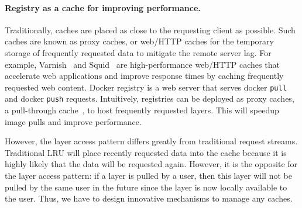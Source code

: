 \paragraph{Registry as a cache for improving performance.}
Traditionally, caches are placed as close to the requesting client as possible. 
Such caches are known as proxy caches, or web/HTTP caches for the temporary storage of 
frequently requested data to mitigate the remote server lag. 
For example, Varnish~\cite{varnish} and Squid~\cite{squid} are high-performance web/HTTP caches that accelerate web applications and improve response times by caching frequently requested web content.
Docker registry is a web server that serves docker \texttt{pull} and docker \texttt{push} requests.
Intuitively, registries can be deployed as proxy caches, \ie a pull-through cache~\cite{registryascache}, to host frequently requested layers. This will speedup image pulls and improve performance. 

However, the layer access pattern differs greatly from traditional request streams.
Traditional LRU will place recently requested data into the cache 
because it is highly likely that the data will be requested again.
However, it is the opposite for the layer access pattern: if a layer is pulled by a user,
then this layer will not be pulled by the same user in the future
since the layer is now locally available to the user. Thus, we have to design innovative mechanisms to manage any caches.




